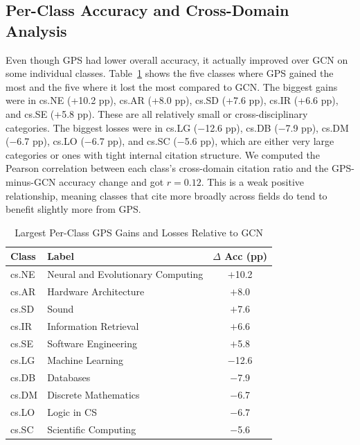 \documentclass[conference]{IEEEtran}
\begin{document}
\subsection{Per-Class Accuracy and Cross-Domain Analysis}

Even though GPS had lower overall accuracy, it actually improved over GCN on some
individual classes. Table~\ref{tab:perclass} shows the five classes where GPS gained the
most and the five where it lost the most compared to GCN. The biggest gains were in
cs.NE (+10.2 pp), cs.AR (+8.0 pp), cs.SD (+7.6 pp), cs.IR (+6.6 pp), and cs.SE (+5.8 pp).
These are all relatively small or cross-disciplinary categories. The biggest losses were
in cs.LG ($-$12.6 pp), cs.DB ($-$7.9 pp), cs.DM ($-$6.7 pp), cs.LO ($-$6.7 pp), and
cs.SC ($-$5.6 pp), which are either very large categories or ones with tight internal
citation structure. We computed the Pearson correlation between each class's cross-domain
citation ratio and the GPS-minus-GCN accuracy change and got $r = 0.12$. This is a weak
positive relationship, meaning classes that cite more broadly across fields do tend to
benefit slightly more from GPS.

\begin{table}[h]
\caption{Largest Per-Class GPS Gains and Losses Relative to GCN}
\label{tab:perclass}
\centering
\begin{tabular}{llc}
\toprule
\textbf{Class} & \textbf{Label} & \textbf{$\Delta$ Acc (pp)} \\
\midrule
cs.NE  & Neural and Evolutionary Computing & $+$10.2 \\
cs.AR  & Hardware Architecture             & $+$8.0  \\
cs.SD  & Sound                             & $+$7.6  \\
cs.IR  & Information Retrieval             & $+$6.6  \\
cs.SE  & Software Engineering              & $+$5.8  \\
\midrule
cs.LG  & Machine Learning                  & $-$12.6 \\
cs.DB  & Databases                         & $-$7.9  \\
cs.DM  & Discrete Mathematics              & $-$6.7  \\
cs.LO  & Logic in CS                       & $-$6.7  \\
cs.SC  & Scientific Computing              & $-$5.6  \\
\bottomrule
\end{tabular}
\end{table}
\end{document}
